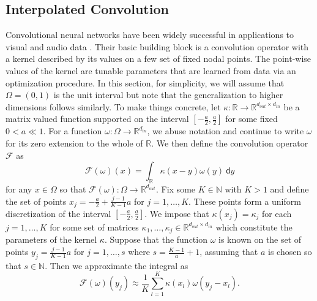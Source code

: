 \documentclass[preprint,11pt]{elsarticle}
\theoremstyle{plain}
\newcommand{\R}{\mathbb{R}}
\newcommand{\N}{\mathbb{N}}
\begin{document}
\subsection{Interpolated Convolution}

Convolutional neural networks have been widely successful in applications to visual and audio data \cite{Goodfellow-et-al-2016}. Their basic building block is a convolution operator with a kernel described by its values on a few set of fixed nodal points. The point-wise values of the kernel are tunable parameters that are learned from data via an optimization procedure. In this section, for simplicity, we will assume that $\Omega = (0,1)$ is the unit interval but note that the generalization to higher dimensions follows similarly. To make things concrete, let $\kappa : \R \to \R^{d_{out} \times d_{in}}$ be a matrix valued function supported on the interval $[-\frac{a}{2},\frac{a}{2}]$ for some fixed $0 < a \ll 1$. For a function $\omega: \Omega \to \R^{d_{in}}$, we abuse notation and continue to write $\omega$ for its zero extension to the whole of $\R$. We then define the convolution operator $\mathcal{F}$ as 
\begin{equation}
    \label{eq:convolution}
    \mathcal{F}(\omega)(x) = \int_{\R} \kappa(x - y)\omega(y) \: \mathsf{d}y
\end{equation}
for any $x \in \Omega$ so that $\mathcal{F}(\omega) : \Omega \to \R^{d_{out}}$. Fix some $K \in \N$ with $K > 1$ and define the set of points $x_j = -\frac{a}{2} + \frac{j-1}{K-1}a$ for $j=1,\dots,K$. These points form a uniform discretization of the interval $[-\frac{a}{2},\frac{a}{2}]$. We impose that $\kappa(x_j) = \kappa_j$ for each $j=1,\dots,K$ for some set of matrices $\kappa_1,\dots,\kappa_j \in \R^{d_{out} \times d_{in}}$ which constitute the parameters of the kernel $\kappa$. Suppose that the function $\omega$ is known on the set of points $y_j = \frac{j-1}{K-1}a$ for $j=1,\dots,s$ where $s = \frac{K-1}{a} + 1$, assuming that $a$ is chosen so that $s \in \N$. Then we approximate the integral as
\begin{equation}
    \mathcal{F}(\omega)(y_j) \approx \frac{1}{K} \sum_{l=1}^K \kappa (x_l) \omega(y_j - x_l).
\end{equation}
\end{document}
